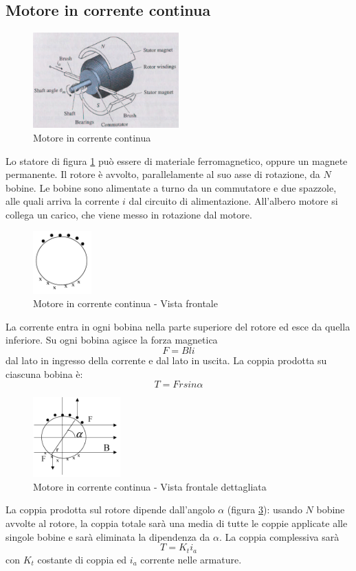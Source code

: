 \documentclass[a4paper]{report}
\begin{document}
\subsection{Motore in corrente continua}
\begin{figure}[!t]
\centering
\includegraphics[width=0.5\textwidth]{./images/motoreDC.png}
\caption{Motore in corrente continua\label{fig:motoreDC}}
\end{figure}
Lo statore di figura \ref{fig:motoreDC} pu\`o essere di materiale ferromagnetico, oppure un magnete
permanente. Il rotore \`e avvolto, parallelamente al suo asse di
rotazione, da $N$ bobine. Le bobine sono alimentate a turno da un
commutatore e due spazzole, alle quali arriva la corrente $i$ dal
circuito di alimentazione. All'albero motore si collega un carico, che
viene messo in rotazione dal motore.
\begin{figure}[!t]
\centering
\includegraphics[width=0.2\textwidth]{./images/motoreDC02.png}
\caption{Motore in corrente continua - Vista frontale\label{fig:motoreDC02}}
\end{figure}
La corrente entra in ogni bobina nella parte superiore del rotore ed
esce da quella inferiore. Su ogni bobina agisce la  forza magnetica
\[
F=Bli
\]
dal lato in ingresso della corrente e dal lato in uscita. La coppia
prodotta su ciascuna bobina \`e:
\[
  T = F r sin \alpha
\]
\begin{figure}[!t]
  \centering
  \includegraphics[width=0.3\textwidth]{./images/motoreDC03.png}
  \caption{Motore in corrente continua - Vista frontale dettagliata
    \label{fig:motoreDC03}}
\end{figure}
La coppia prodotta sul rotore dipende dall'angolo $\alpha$ (figura
\ref{fig:motoreDC03}): usando $N$ 
bobine avvolte al rotore, la coppia totale sar\`a una media di tutte
le coppie applicate alle singole bobine e sar\`a eliminata la dipendenza da
$\alpha$. La coppia complessiva sar\`a
\[
  T = K_t i_a
\]
con $K_t$ costante di coppia ed $i_a$ corrente nelle
armature. 
\end{document}
